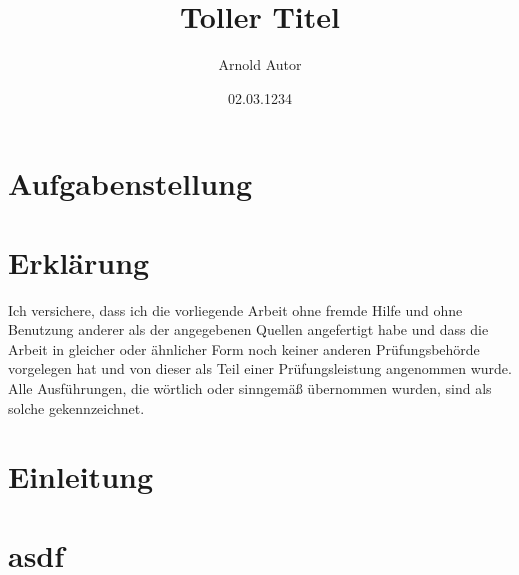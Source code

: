 \documentclass[draft]{max-masterarbeit} %
\title{Toller Titel}
\author{Arnold Autor}
\date{02.03.1234}
\begin{document}
\frontmatter
{} %

\titelseiteLRT
\pagestyle{empty}
\cleardoublepage
\chapter*{Aufgabenstellung}
\thispagestyle{empty}
\cleardoublepage
\chapter*{Erklärung}
\thispagestyle{empty}
Ich versichere, dass ich die vorliegende Arbeit ohne fremde Hilfe und ohne Benutzung anderer als
der angegebenen Quellen angefertigt habe und dass die Arbeit in gleicher oder ähnlicher Form noch
keiner anderen Prüfungsbehörde vorgelegen hat und von dieser als Teil einer Prüfungsleistung
angenommen wurde. Alle Ausführungen, die wörtlich oder sinngemäß übernommen wurden, sind als 
solche gekennzeichnet.

\vspace{4.5em}

\makeatletter
\let\thedate\@date
\let\theauthor\@author
\makeatother
\newcommand{\unterschriftsbreite}{.35\linewidth}
%

\cleardoublepage
{}
\pagestyle{scrheadings}
\tableofcontents



\mainmatter
\chapter{Einleitung}


\chapter{asdf}
\blindtext \cite{beispielquelle}
\end{document}
